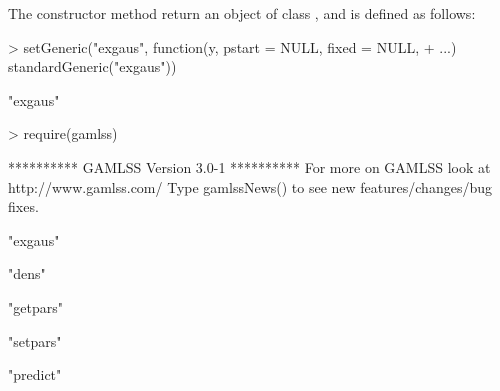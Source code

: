 \documentclass[article]{jss}
\begin{document}
The constructor method return an object of class , and is
defined as follows:
\begin{Schunk}
\begin{Sinput}
> setGeneric("exgaus", function(y, pstart = NULL, fixed = NULL, 
+     ...) standardGeneric("exgaus"))
\end{Sinput}
\begin{Soutput}
[1] "exgaus"
\end{Soutput}
\begin{Sinput}
> require(gamlss)
\end{Sinput}
\begin{Soutput}
 **********   GAMLSS Version 3.0-1 ********** 
For more on GAMLSS look at http://www.gamlss.com/ 
Type gamlssNews() to see new features/changes/bug fixes.
\end{Soutput}
\begin{Soutput}
[1] "exgaus"
\end{Soutput}
\end{Schunk}



\begin{Schunk}
\begin{Soutput}
[1] "dens"
\end{Soutput}
\begin{Soutput}
[1] "getpars"
\end{Soutput}
\begin{Soutput}
[1] "setpars"
\end{Soutput}
\begin{Soutput}
[1] "predict"
\end{Soutput}
\end{Schunk}
\end{document}
